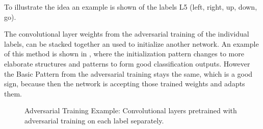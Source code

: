 To illustrate the idea an example is shown of the labels L5 (left, right, up, down, go).

The convolutional layer weights from the adversarial training of the individual labels, 
can be stacked together an used to initialize another network.
An example of this method is shown in , where the initialization pattern changes to more elaborate structures and patterns to form good classification outputs. 
However the Basic Pattern from the adversarial training stays the same, which is a good sign, because then the network is accepting those trained weights and adapts them.

\begin{figure}[!ht]
  \centering
    \quad
  \caption{Adversarial Training Example: Convolutional layers pretrained with adversarial training on each label separately.}
  \label{fig:nn_adv_example}
\end{figure}
\FloatBarrier
\noindent

